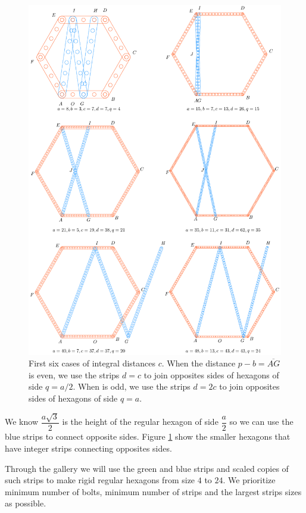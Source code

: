 \documentclass[11pt]{article}
\begin{document}
\begin{figure}[H]
\centering
\includegraphics[scale=0.8]{build/hexa-builder-b}
\caption{First six cases of integral distances $c$. When the distance $p-b = \overline{AG}$ is even, we use the strips $d = c$ to join opposites sides of hexagons of side $q = a/2$. When is odd, we use the strips $d = 2c$ to join opposites sides of hexagons of side $q = a$.}
\label{fig:builder-b}
\end{figure}

We know $\dfrac{a\sqrt3}2$ is the height of the regular hexagon of side $\dfrac{a}2$ so we can use the blue strips to connect opposite sides. Figure \ref{fig:builder-b} show the smaller hexagons that have integer strips connecting opposites sides.

Through the gallery we will use the green and blue strips and scaled copies of such strips to make rigid regular hexagons from size $4$ to $24$. We prioritize minimum number of bolts, minimum number of strips and the largest strips sizes as possible.
\end{document}
